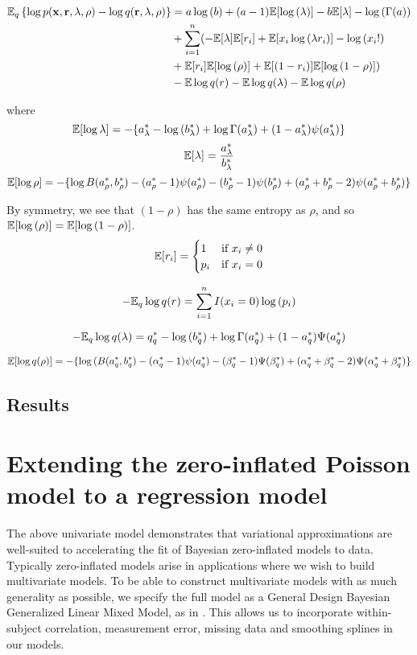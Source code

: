 \documentclass{amsart}
\begin{document}
\begin{align*}
\mathbb{E}_q \left\{ \log{p(\bf x, \bf r, \lambda, \rho)} - \log{q(\bf r, \lambda, \rho)} \right\} &= 
a \log{(b)} + (a - 1) \mathbb{E}[\log{(\lambda)}] - b \mathbb{E} [\lambda] - \log{(\Gamma(a))} \\
&+ \sum_{i=1}^n  ( -\mathbb{E} [\lambda] \mathbb{E} [r_i] + \mathbb{E}[x_i \log{(\lambda r_i)}] - \log{(x_i!)} \\
&+ \mathbb{E}[r_i] \mathbb{E}[\log{(\rho)}] + \mathbb{E}[(1 - r_i)] \mathbb{E}[\log{(1 - \rho)}] ) \\
& - \mathbb{E} \log{q(r)} - \mathbb{E} \log{q(\lambda)} - \mathbb{E} \log{q(\rho)}
\end{align*}

where
$$
\mathbb{E} [\log{\lambda}] = -\{ a_\lambda^* - \log{(b_\lambda^*)} + \log{\Gamma(a_\lambda^*)} + (1 - a_\lambda^*) \psi{(a_\lambda^*)} \} \\
$$
$$
\mathbb{E} [\lambda] = \frac{a_\lambda^*}{b_\lambda^*} \\
$$
$$
\mathbb{E}[\log{\rho}] = - \{ \log{B(a_\rho^*, b_\rho^*)} - (a_\rho^* - 1) \psi{(a_\rho^*)} - (b_\rho^* - 1)\psi{(b_\rho^*)} + (a_\rho^* + b_\rho^* - 2)\psi{(a_\rho^* + b_\rho^*)} \} \\
$$

By symmetry, we see that $(1 - \rho)$ has the same entropy as $\rho$,
and so $\mathbb{E} [\log{(\rho)}] = \mathbb{E} [\log{(1 - \rho)}]$.
$$
\mathbb{E}[r_i] = 
	\begin{cases}
	1 & \text{if } x_i \ne 0 \\
	p_i & \text{if } x_i = 0 \\
	\end{cases}
$$

$$
-\mathbb{E}_q \log{q(r)} = \sum_{i=1}^n I(x_i = 0) \log{(p_i)}
$$

$$
-\mathbb{E}_q \log{q(\lambda)} = q_q^* - \log{(b_q^*)} + \log{\Gamma{(a_q^*)}} + (1 - a_q^*) \Psi{(a_q^*)}
$$

$$
\mathbb{E}[\log{q(\rho)}] = - \{ \log{(B(a_q^*, b_q^*)} - (\alpha_q^* - 1) \psi{(a_q^*)} - (\beta_q^* - 1)\Psi{(\beta_q^*)} + (\alpha_q^* + \beta_q^* - 2)\Psi{(\alpha_q^* + \beta_q^*)} \}
$$

\subsection{Results}

\section{Extending the zero-inflated Poisson model to a regression model}
The above univariate model demonstrates that variational approximations are well-suited
to accelerating the fit of Bayesian zero-inflated models to data. Typically zero-inflated
models arise in applications where we wish to build multivariate models. To be able to
construct multivariate models with as much generality as possible, we specify the full
model as a General Design Bayesian Generalized Linear Mixed Model, as in \cite{zhao06}.
This allows us to incorporate within-subject correlation, measurement error, missing data
and smoothing splines in our models.
\end{document}
